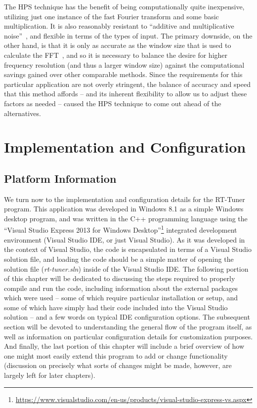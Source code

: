 \documentclass[12pt]{report}
\begin{document}
The HPS technique has the benefit of being computationally quite inexpensive, utilizing just one instance of the fast Fourier transform and some basic multiplication. It is also reasonably resistant to ``additive and multiplicative noise''~\cite{Middleton2003}, and flexible in terms of the types of input. The primary downside, on the other hand, is that it is only as accurate as the window size that is used to calculate the FFT~\cite{Middleton2003}, and so it is necessary to balance the desire for higher frequency resolution (and thus a larger window size) against the computational savings gained over other comparable methods. Since the requirements for this particular application are not overly stringent, the balance of accuracy and speed that this method affords -- and its inherent flexibility to allow us to adjust these factors as needed -- caused the HPS technique to come out ahead of the alternatives.

\clearpage

\chapter[Implementation and Configuration]{Implementation and Configuration}
\section{Platform Information}
\indent We turn now to the implementation and configuration details for the RT-Tuner program. This application was developed in Windows 8.1 as a simple Windows desktop program, and was written in the C++ programming language using the ``Visual Studio Express 2013 for Windows Desktop''\footnote{\url{https://www.visualstudio.com/en-us/products/visual-studio-express-vs.aspx}} integrated development environment (Visual Studio IDE, or just Visual Studio). As it was developed in the context of Visual Studio, the code is encapsulated in terms of a Visual Studio solution file, and loading the code should be a simple matter of opening the solution file (\emph{rt-tuner.sln}) inside of the Visual Studio IDE. The following portion of this chapter will be dedicated to discussing the steps required to properly compile and run the code, including information about the external packages which were used -- some of which require particular installation or setup, and some of which have simply had their code included into the Visual Studio solution -- and  a few words on typical IDE configuration options. The subsequent section will be devoted to understanding the general flow of the program itself, as well as information on particular configuration details for customization purposes. And finally, the last portion of this chapter will include a brief overview of how one might most easily extend this program to add or change functionality (discussion on precisely what sorts of changes might be made, however, are largely left for later chapters).
\clearpage
\end{document}
